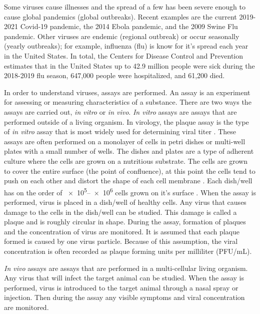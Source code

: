 Some viruses cause illnesses and the spread of a few has been severe enough to cause global pandemics (global outbreaks). Recent examples are the current 2019-2021 Covid-19 pandemic, the 2014 Ebola pandemic, and the 2009 Swine Flu pandemic. Other viruses are endemic (regional outbreak) or occur seasonally (yearly outbreaks); for example, influenza (flu) is know for it's spread each year in the United States. In total, the Centers for Disease Control and Prevention estimates that in the United States up to 42.9 million people were sick during the 2018-2019 flu season, 647,000 people were hospitalized, and 61,200 died. \citep{xu_update_2019}

In order to understand viruses, assays are performed. An assay is an experiment for assessing or measuring characteristics of a substance. There are two ways the assays are carried out, \emph{in vitro} or \emph{in vivo}. \emph{In vitro} assays are assays that are performed outside of a living organism. In virology, the plaque assay is the type of \emph{in vitro} assay that is most widely used for determining viral titer \citep{pankaj_virus_2021}.  These assays are often performed on a monolayer of cells in petri dishes or multi-well plates with a small number of wells. The dishes and plates are a type of adherent culture where the cells are grown on a nutritious substrate. The cells are grown to cover the entire surface (the point of confluence), at this point the cells tend to push on each other and distort the shape of each cell membrane \citep{bruckner_importance_2018}. Each dish/well has on the order of \numrange[range-phrase = --]{e5}{e6} cells grown on it's surface \citep{Number_of_cells_in_a_dish}. When the assay is performed, virus is placed in a dish/well of healthy cells. Any virus that causes damage to the cells in the dish/well can be studied. This damage is called a plaque and is roughly circular in shape. During the assay, formation of plaques and the concentration of virus are monitored. It is assumed that each plaque formed is caused by one virus particle. Because of this assumption, the viral concentration is often recorded as plaque forming units per milliliter (PFU/mL). 

\emph{In vivo} assays are assays that are performed in a multi-cellular living organism. Any virus that will infect the target animal can be studied. When the assay is performed, virus is introduced to the target animal through a nasal spray or injection. Then during the assay any visible symptoms and viral concentration are monitored.%

